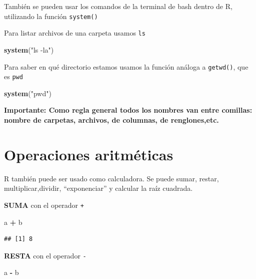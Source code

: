 \documentclass[
]{book}
\newenvironment{Shaded}{\begin{snugshade}}{\end{snugshade}}
\newcommand{\FunctionTok}[1]{\textcolor[rgb]{0.13,0.29,0.53}{\textbf{#1}}}
\newcommand{\NormalTok}[1]{#1}
\newcommand{\SpecialCharTok}[1]{\textcolor[rgb]{0.81,0.36,0.00}{\textbf{#1}}}
\newcommand{\StringTok}[1]{\textcolor[rgb]{0.31,0.60,0.02}{#1}}
\begin{document}
También se pueden usar los comandos de la terminal de bash dentro de R, utilizando la función \texttt{system()}

Para listar archivos de una carpeta usamos \texttt{ls}

\begin{Shaded}
\begin{Highlighting}[]
\FunctionTok{system}\NormalTok{(}\StringTok{"ls {-}la"}\NormalTok{)}
\end{Highlighting}
\end{Shaded}

Para saber en qué directorio estamos usamos la función análoga a \texttt{getwd()}, que es \texttt{pwd}

\begin{Shaded}
\begin{Highlighting}[]
\FunctionTok{system}\NormalTok{(}\StringTok{"pwd"}\NormalTok{)}
\end{Highlighting}
\end{Shaded}

\textbf{Importante: Como regla general todos los nombres van entre comillas: nombre de carpetas, archivos, de columnas, de renglones,etc.}

\section{Operaciones aritméticas}\label{operaciones-aritmuxe9ticas}

R también puede ser usado como calculadora.
Se puede sumar, restar, multiplicar,dividir, ``exponenciar'' y calcular la raíz cuadrada.

\textbf{SUMA} con el operador \texttt{+}

\begin{Shaded}
\begin{Highlighting}[]
\NormalTok{a }\SpecialCharTok{+}\NormalTok{ b}
\end{Highlighting}
\end{Shaded}

\begin{verbatim}
## [1] 8
\end{verbatim}

\textbf{RESTA} con el operador \texttt{-}

\begin{Shaded}
\begin{Highlighting}[]
\NormalTok{a }\SpecialCharTok{{-}}\NormalTok{ b}
\end{Highlighting}
\end{Shaded}
\end{document}
